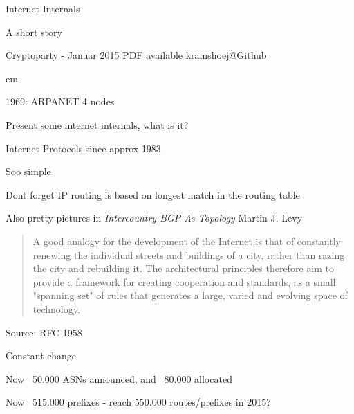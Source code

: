 \documentclass[20pt,landscape,a4paper,footrule]{foils}
\begin{document}


\mytitlepage
{Internet Internals

A short story}


\centerline{\footnotesize Cryptoparty - Januar 2015
 PDF available kramshoej@Github}

\LogoOn



 cm


\centerline{1969: ARPANET 4 nodes}


\begin{list1}
\item Present some internet internals, what is it?
\end{list1}


\vskip 1cm
\centerline{Internet Protocols since approx 1983}



\centerline{Soo simple \smiley}

Dont forget IP routing is based on longest match in the routing table



Also pretty pictures in \emph{Intercountry BGP As Topology} Martin J. Levy\\




\begin{quote}
 A good analogy for the development of the Internet is that of
 constantly renewing the individual streets and buildings of a city,
 rather than razing the city and rebuilding it. The architectural
 principles therefore aim to provide a framework for creating
 cooperation and standards, as a small "spanning set" of rules that
 generates a large, varied and evolving space of technology.
\end{quote}
Source: RFC-1958

\begin{list2}
\item Constant change
\item Now ~50.000 ASNs announced, and ~80.000 allocated
\item Now ~515.000 prefixes - reach 550.000 routes/prefixes in 2015?
\end{list2}
\end{document}
